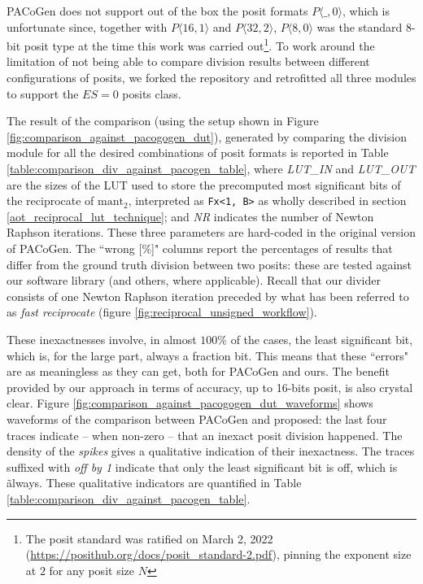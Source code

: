 PACoGen does not support out of the box the posit formats $P\langle\_, 0\rangle$, which is unfortunate since, together with $P\langle16, 1\rangle$ and $P\langle32, 2\rangle$, $P\langle8, 0\rangle$ was the standard $8$-bit posit type at the time this work was carried out\footnote{The posit standard was ratified on March 2, 2022 (\url{https://posithub.org/docs/posit_standard-2.pdf}), pinning the exponent size at $2$ for any posit size $N$}.
To work around the limitation of not being able to compare division results between different configurations of posits, we forked the repository and retrofitted all three modules to support the $ES = 0$ posits class.

The result of the comparison (using the setup shown in Figure \ref{fig:comparison_against_pacogogen_dut}), generated by comparing the division module
for all the desired combinations of posit formats is reported in Table \ref{table:comparison_div_against_pacogen_table}, where \textit{LUT\_IN} and \textit{LUT\_OUT} are the sizes of the LUT used to store the precomputed most significant bits of the reciprocate of $\text{mant}_2$, interpreted as \texttt{Fx<1, B>} as wholly described in section \ref{aot_reciprocal_lut_technique}; and \textit{NR} indicates the number of Newton Raphson iterations. These three parameters are hard-coded in the original version of PACoGen.
The ``wrong [\%]" columns report the percentages of results that differ from the ground truth division between two posits: these are tested against our software library (and others, where applicable).
Recall that our divider consists of one Newton Raphson iteration preceded by what has been referred to as \textit{fast reciprocate} (figure \ref{fig:reciprocal_unsigned_workflow}).

These inexactnesses involve, in almost $100 \%$ of the cases, the least significant bit, which is, for the large part, always a fraction bit. This means that these ``errors" are as meaningless as they can get, both for PACoGen and ours.
The benefit provided by our approach in terms of accuracy, up to 16-bits posit, is also crystal clear. Figure \ref{fig:comparison_against_pacogogen_dut_waveforms} shows waveforms of the comparison between PACoGen and proposed: the last four traces indicate -- when non-zero -- that an inexact posit division happened. The density of the \textit{spikes} gives a qualitative indication of their inexactness. The traces suffixed with \textit{off by 1} indicate that only the least significant bit is off, which is \~ always. These qualitative indicators are quantified in Table \ref{table:comparison_div_against_pacogen_table}.


